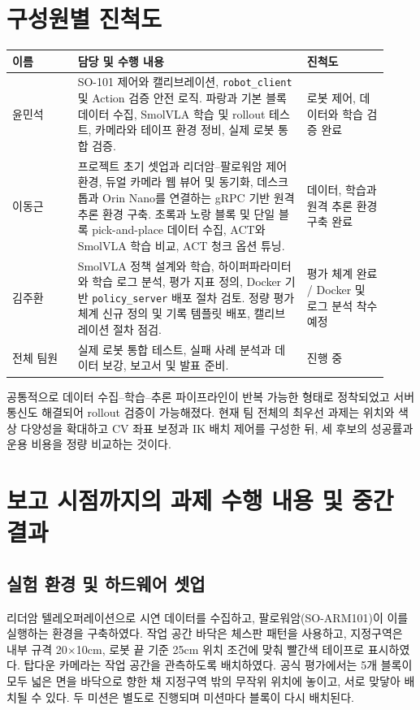 \documentclass[titlepage]{pnureport}
\begin{document}
\chapter{구성원별 진척도}

\begin{longtable}{p{0.16\linewidth}p{0.56\linewidth}p{0.20\linewidth}}
\toprule
이름 & 담당 및 수행 내용 & 진척도 \\
\midrule
\endhead
윤민석 & SO-101 제어와 캘리브레이션, \texttt{robot\_client} 및 Action 검증 안전 로직. 파랑과 기본 블록 데이터 수집, SmolVLA 학습 및 rollout 테스트, 카메라와 테이프 환경 정비, 실제 로봇 통합 검증. & 로봇 제어, 데이터와 학습 검증 완료 \\
이동근 & 프로젝트 초기 셋업과 리더암--팔로워암 제어 환경, 듀얼 카메라 웹 뷰어 및 동기화, 데스크톱과 Orin Nano를 연결하는 gRPC 기반 원격 추론 환경 구축. 초록과 노랑 블록 및 단일 블록 pick-and-place 데이터 수집, ACT와 SmolVLA 학습 비교, ACT 청크 옵션 튜닝. & 데이터, 학습과 원격 추론 환경 구축 완료 \\
김주환 & SmolVLA 정책 설계와 학습, 하이퍼파라미터와 학습 로그 분석, 평가 지표 정의, Docker 기반 \texttt{policy\_server} 배포 절차 검토. 정량 평가 체계 신규 정의 및 기록 템플릿 배포, 캘리브레이션 절차 점검. & 평가 체계 완료 / Docker 및 로그 분석 착수 예정 \\
전체 팀원 & 실제 로봇 통합 테스트, 실패 사례 분석과 데이터 보강, 보고서 및 발표 준비. & 진행 중 \\
\bottomrule
\end{longtable}

공통적으로 데이터 수집--학습--추론 파이프라인이 반복 가능한 형태로 정착되었고 서버 통신도 해결되어 rollout 검증이 가능해졌다. 현재 팀 전체의 최우선 과제는 위치와 색상 다양성을 확대하고 CV 좌표 보정과 IK 배치 제어를 구성한 뒤, 세 후보의 성공률과 운용 비용을 정량 비교하는 것이다.

\chapter{보고 시점까지의 과제 수행 내용 및 중간 결과}

\section{실험 환경 및 하드웨어 셋업}

리더암 텔레오퍼레이션으로 시연 데이터를 수집하고, 팔로워암(SO-ARM101)이 이를 실행하는 환경을 구축하였다. 작업 공간 바닥은 체스판 패턴을 사용하고, 지정구역은 내부 규격 20$\times$10cm, 로봇 끝 기준 25cm 위치 조건에 맞춰 빨간색 테이프로 표시하였다. 탑다운 카메라는 작업 공간을 관측하도록 배치하였다. 공식 평가에서는 5개 블록이 모두 넓은 면을 바닥으로 향한 채 지정구역 밖의 무작위 위치에 놓이고, 서로 맞닿아 배치될 수 있다. 두 미션은 별도로 진행되며 미션마다 블록이 다시 배치된다.
\end{document}
